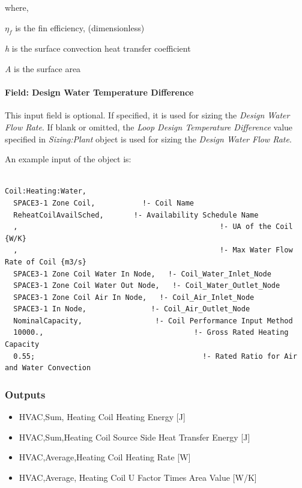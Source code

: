 where,

\({\eta_f}\) is the fin efficiency, (dimensionless)

\emph{h} is the surface convection heat transfer coefficient

\emph{A} is the surface area

\paragraph{Field: Design Water Temperature Difference}\label{field-design-water-temperature-difference}

This input field is optional. If specified, it is used for sizing the \textit{Design Water Flow Rate}. If blank or omitted, the \textit{Loop Design Temperature Difference} value specified in \textit{Sizing:Plant} object is used for sizing the \textit{Design Water Flow Rate}.

An example input of the object is:

\begin{lstlisting}

Coil:Heating:Water,
  SPACE3-1 Zone Coil,           !- Coil Name
  ReheatCoilAvailSched,       !- Availability Schedule Name
  ,                                               !- UA of the Coil {W/K}
  ,                                               !- Max Water Flow Rate of Coil {m3/s}
  SPACE3-1 Zone Coil Water In Node,   !- Coil_Water_Inlet_Node
  SPACE3-1 Zone Coil Water Out Node,   !- Coil_Water_Outlet_Node
  SPACE3-1 Zone Coil Air In Node,   !- Coil_Air_Inlet_Node
  SPACE3-1 In Node,               !- Coil_Air_Outlet_Node
  NominalCapacity,                 !- Coil Performance Input Method
  10000.,                                   !- Gross Rated Heating Capacity
  0.55;                                       !- Rated Ratio for Air and Water Convection
\end{lstlisting}

\subsubsection{Outputs}\label{outputs-1-013}

\begin{itemize}
\item
  HVAC,Sum, Heating Coil Heating Energy {[}J{]}
\item
  HVAC,Sum,Heating Coil Source Side Heat Transfer Energy {[}J{]}
\item
  HVAC,Average,Heating Coil Heating Rate {[}W{]}
\item
  HVAC,Average, Heating Coil U Factor Times Area Value {[}W/K{]}
\end{itemize}

